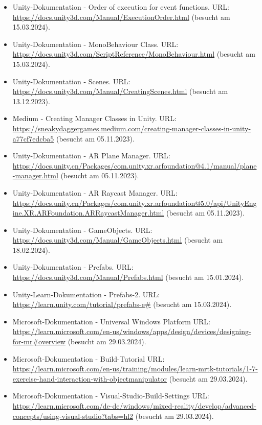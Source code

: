 \begin{itemize}[leftmargin=0pt]
    \item Unity-Dokumentation - Order of execution for event functions. {\scriptsize URL:} \url{https://docs.unity3d.com/Manual/ExecutionOrder.html} (besucht am 15.03.2024).
    \item Unity-Dokumentation - MonoBehaviour Class. {\scriptsize URL:} \url{https://docs.unity3d.com/ScriptReference/MonoBehaviour.html} (besucht am 15.03.2024).
    \item Unity-Dokumentation - Scenes. {\scriptsize URL:} \url{https://docs.unity3d.com/Manual/CreatingScenes.html} (besucht am 13.12.2023).
    \item Medium - Creating Manager Classes in Unity. {\scriptsize URL:} \url{https://sneakydaggergames.medium.com/creating-manager-classes-in-unity-a77cf7edcba5} (besucht am 05.11.2023).
    \item Unity-Dokumentation - AR Plane Manager. {\scriptsize URL:} \url{https://docs.unity.cn/Packages/com.unity.xr.arfoundation@4.1/manual/plane-manager.html} (besucht am 05.11.2023).
    \item Unity-Dokumentation - AR Raycast Manager. {\scriptsize URL:} \url{https://docs.unity.cn/Packages/com.unity.xr.arfoundation@5.0/api/UnityEngine.XR.ARFoundation.ARRaycastManager.html} (besucht am 05.11.2023).
    \item Unity-Dokumentation - GameObjects. {\scriptsize URL:} \url{https://docs.unity3d.com/Manual/GameObjects.html} (besucht am 18.02.2024).
    \item Unity-Dokumentation - Prefabs. {\scriptsize URL:} \url{https://docs.unity3d.com/Manual/Prefabs.html} (besucht am 15.01.2024).
    \item Unity-Learn-Dokumentation - Prefabs-2. {\scriptsize URL:} \url{https://learn.unity.com/tutorial/prefabs-e#} (besucht am 15.03.2024).
    \item Microsoft-Dokumentation - Universal Windows Platform {\scriptsize URL:} \url{https://learn.microsoft.com/en-us/windows/apps/design/devices/designing-for-mr#overview} (besucht am 29.03.2024).
    \item Microsoft-Dokumentation - Build-Tutorial {\scriptsize URL:} \url{https://learn.microsoft.com/en-us/training/modules/learn-mrtk-tutorials/1-7-exercise-hand-interaction-with-objectmanipulator} (besucht am 29.03.2024).
    \item Microsoft-Dokumentation - Visual-Studio-Build-Settings {\scriptsize URL:} \url{https://learn.microsoft.com/de-de/windows/mixed-reality/develop/advanced-concepts/using-visual-studio?tabs=hl2} (besucht am 29.03.2024).

\end{itemize}

